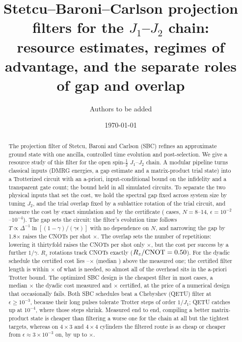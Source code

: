\documentclass[aps,pra,twocolumn,superscriptaddress,nofootinbib]{revtex4-2}
\begin{document}
\title{Stetcu--Baroni--Carlson projection filters for the $J_1$--$J_2$ chain:\\
resource estimates, regimes of advantage, and the separate roles of gap and overlap}

\author{Authors to be added}
\date{\today}

\begin{abstract}
The projection filter of Stetcu, Baroni and Carlson (SBC) refines an approximate ground state with one
ancilla, controlled time evolution and post-selection. We give a resource study of this filter for the
open spin-$\tfrac12$ $J_1$--$J_2$ chain. A modular pipeline turns classical inputs (DMRG energies, a gap
estimate and a matrix-product trial state) into a Trotterized circuit with an a-priori, input-conditional
bound on the infidelity and a transparent gate count; the bound held in all \nSimOK{} simulated circuits.
To separate the two physical inputs that set the cost, we hold the spectral gap fixed across system size by
tuning $J_2$, and the trial overlap fixed by a sublattice rotation of the trial circuit, and measure the
cost by exact simulation and by the certificate (\goNcases{} cases, $N=8$--14,
$\epsilon=10^{-2}$--$10^{-4}$). The gap sets the circuit: the filter's evolution time follows
$T\propto\Delta^{-1}\ln[(1-\gamma)/(\gamma\epsilon)]$ with no dependence on $N$, and narrowing the gap by
1.8$\times$ raises the CNOTs per shot \fBMDcnot$\times$. The overlap sets the number of repetitions: lowering
it thirtyfold raises the CNOTs per shot only \fAMDcnot$\times$, but the cost per success by a further
$1/\gamma$. $R_z$ rotations track CNOTs exactly ($R_z/\mathrm{CNOT}=0.50$). For the dyadic schedule the certified cost lies
\goCertRatioMin--\goCertRatioMax$\times$ (median \goCertRatioMed) above the measured one; the certified filter
length is within \fCMDtime$\times$ of what is needed, so almost all of the overhead sits in the a-priori
Trotter bound. The optimized SBC design is the cheapest filter in most cases, a median \odMMed$\times$ the
dyadic cost measured and \odCMed$\times$ certified, at the price of a numerical design that occasionally
fails. Both SBC schedules beat a Chebyshev (QETU) filter at $\epsilon\ge10^{-3}$, because their long pulses
tolerate Trotter steps of order $1/J_1$; QETU catches up at $10^{-4}$, where those steps shrink.
Measured end to end, compiling a better matrix-product state is cheaper than filtering a worse one for
the chain at all but the tightest targets, whereas on $4\times3$ and $4\times4$ cylinders the filtered route
is as cheap or cheaper from $\epsilon\approx3\times10^{-3}$ on, by up to \actRatioMax$\times$.
\end{abstract}
\end{document}
